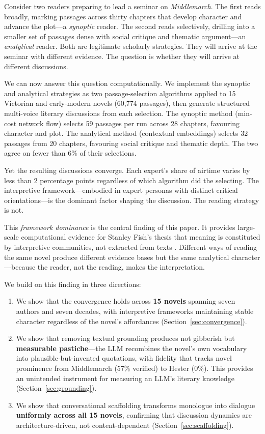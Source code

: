 \documentclass[final]{clv2025}
\begin{document}
Consider two readers preparing to lead a seminar on \textit{Middlemarch}.
The first reads broadly, marking passages across thirty chapters that
develop character and advance the plot---a \emph{synoptic} reader.
The second reads selectively, drilling into a smaller set of passages
dense with social critique and thematic argument---an \emph{analytical}
reader.  Both are legitimate scholarly strategies.  They will arrive at
the seminar with different evidence.  The question is whether they will
arrive at different discussions.

We can now answer this question computationally.  We implement the
synoptic and analytical strategies as two passage-selection algorithms
applied to 15 Victorian and early-modern novels (60,774 passages), then
generate structured multi-voice literary discussions from each
selection.  The synoptic method (min-cost network flow) selects 59
passages per run across 28 chapters, favouring character and plot.  The
analytical method (contextual embeddings) selects 32 passages from 20
chapters, favouring social critique and thematic depth.  The two agree
on fewer than 6\% of their selections.

Yet the resulting discussions converge.  Each expert's share of
airtime varies by less than 2 percentage points regardless of which
algorithm did the selecting.  The interpretive framework---embodied in
expert personas with distinct critical orientations---is the dominant
factor shaping the discussion.  The reading strategy is not.

This \emph{framework dominance} is the central finding of this paper.
It provides large-scale computational evidence for Stanley Fish's
thesis that meaning is constituted by interpretive communities, not
extracted from texts \cite{fish1980text}.  Different ways of reading
the same novel produce different evidence bases but the same analytical
character---because the reader, not the reading, makes the
interpretation.

We build on this finding in three directions:

\begin{enumerate}
\item We show that the convergence holds across \textbf{15 novels}
spanning seven authors and seven decades, with interpretive frameworks
maintaining stable character regardless of the novel's affordances
(Section~\ref{sec:convergence}).

\item We show that removing textual grounding produces not gibberish
but \textbf{measurable pastiche}---the LLM recombines the novel's own
vocabulary into plausible-but-invented quotations, with fidelity that
tracks novel prominence from Middlemarch (57\% verified) to Hester
(0\%).  This provides an unintended instrument for measuring an LLM's
literary knowledge (Section~\ref{sec:grounding}).

\item We show that conversational scaffolding transforms monologue into
dialogue \textbf{uniformly across all 15 novels}, confirming that
discussion dynamics are architecture-driven, not content-dependent
(Section~\ref{sec:scaffolding}).
\end{enumerate}
\end{document}
